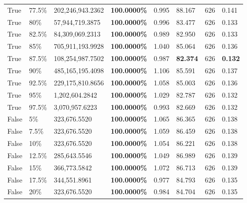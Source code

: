 \begin{table}[H]
\begin{tabular}{lllrllll}
\cline{1-8} \cline{2-8}
True & 77.5\% & 202,246,943.2362 & \bfseries \color{red} 100.0000\% & 0.995 & 88.167 & 626 & 0.141 \\
\cline{1-8} \cline{2-8}
True & 80\% & 57,944,719.3875 & \bfseries \color{red} 100.0000\% & 0.996 & 83.477 & 626 & 0.133 \\
\cline{1-8} \cline{2-8}
True & 82.5\% & 84,309,069.2313 & \bfseries \color{red} 100.0000\% & 0.989 & 82.950 & 626 & 0.133 \\
\cline{1-8} \cline{2-8}
True & 85\% & 705,911,193.9928 & \bfseries \color{red} 100.0000\% & 1.040 & 85.064 & 626 & 0.136 \\
\cline{1-8} \cline{2-8}
True & 87.5\% & 108,254,987.7502 & \bfseries \color{red} 100.0000\% & 0.987 & \bfseries \color{red} 82.374 & 626 & \bfseries \color{red} 0.132 \\
\cline{1-8} \cline{2-8}
True & 90\% & 485,165,195.4098 & \bfseries \color{red} 100.0000\% & 1.106 & 85.591 & 626 & 0.137 \\
\cline{1-8} \cline{2-8}
True & 92.5\% & 229,175,810.8656 & \bfseries \color{red} 100.0000\% & 1.058 & 85.003 & 626 & 0.136 \\
\cline{1-8} \cline{2-8}
True & 95\% & 1,202,604.2842 & \bfseries \color{red} 100.0000\% & 1.029 & 82.787 & 626 & 0.132 \\
\cline{1-8} \cline{2-8}
True & 97.5\% & 3,070,957.6223 & \bfseries \color{red} 100.0000\% & 0.993 & 82.669 & 626 & 0.132 \\
\cline{1-8} \cline{2-8}
False & 5\% & 323,676.5520 & \bfseries \color{red} 100.0000\% & 1.065 & 86.365 & 626 & 0.138 \\
\cline{1-8} \cline{2-8}
False & 7.5\% & 323,676.5520 & \bfseries \color{red} 100.0000\% & 1.059 & 86.459 & 626 & 0.138 \\
\cline{1-8} \cline{2-8}
False & 10\% & 323,676.5520 & \bfseries \color{red} 100.0000\% & 1.054 & 86.221 & 626 & 0.138 \\
\cline{1-8} \cline{2-8}
False & 12.5\% & \color{red} 285,643.5546 & \bfseries \color{red} 100.0000\% & 1.049 & 86.989 & 626 & 0.139 \\
\cline{1-8} \cline{2-8}
False & 15\% & 366,773.5842 & \bfseries \color{red} 100.0000\% & 1.072 & 86.713 & 626 & 0.139 \\
\cline{1-8} \cline{2-8}
False & 17.5\% & 344,551.8961 & \bfseries \color{red} 100.0000\% & 0.977 & 84.793 & 626 & 0.135 \\
\cline{1-8} \cline{2-8}
False & 20\% & 323,676.5520 & \bfseries \color{red} 100.0000\% & 0.984 & 84.704 & 626 & 0.135 \\

\end{tabular}
\end{table}
